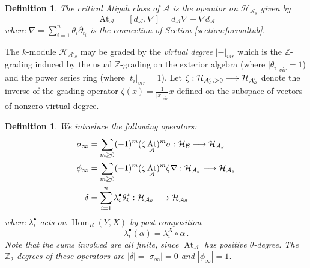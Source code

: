 \documentclass[english,letter paper,12pt,leqno]{article}
\theoremstyle{example}
\newtheorem{definition}[theorem]{Definition}
\numberwithin{equation}{section}
\def\AA{\mathcal{A}}
\def\BB{\mathcal{B}}
\def\HH{\HH}
\def\HH{\mathcal{H}}
\def\Hom{\operatorname{Hom}}
\def\nZ{\mathds{Z}}
\DeclareMathOperator{\vAt}{At}
\begin{document}
\begin{definition}\label{defn:atiyah_class} The \emph{critical Atiyah class} of $\AA$ is the operator on $\HH_{\AA_\theta}$ given by
\[
\vAt_{\AA} = [ d_{\AA}, \nabla ] = d_{\AA} \nabla + \nabla d_{\AA}
\]
where $\nabla = \sum_{i=1}^n \theta_i \partial_{t_i}$ is the connection of Section \ref{section:formaltub}.
\end{definition}

The $k$-module $\HH_{\AA'_\theta}$ may be graded by the \emph{virtual degree} $|-|_{vir}$ which is the $\nZ$-grading induced by the usual $\nZ$-grading on the exterior algebra (where $|\theta_i|_{vir} = 1$) and the power series ring (where $|t_i|_{vir} = 1$). Let $\zeta: \HH_{\AA'_\theta,>0} \lto \HH_{\AA'_\theta}$ denote the inverse of the grading operator $\zeta(x) = \frac{1}{|x|_{vir}} x$ defined on the subspace of vectors of nonzero virtual degree. 

\begin{definition}\label{defn:important_operators} We introduce the following operators:
\begin{align*}
\sigma_\infty &= \sum_{m \ge 0} (-1)^m (\zeta \vAt_{\AA})^m \sigma: \HH_{\BB} \lto \HH_{\AA_\theta}\\
\phi_\infty &= \sum_{m \ge 0} (-1)^m (\zeta \vAt_{\AA})^m \zeta \nabla: \HH_{\AA_\theta} \lto \HH_{\AA_\theta}\\
\delta &= \sum_{i=1}^n \lambda^\bullet_i \theta_i^*: \HH_{\AA_\theta} \lto \HH_{\AA_\theta}
\end{align*}
where $\lambda_i^\bullet$ acts on $\Hom_R(Y,X)$ by post-composition
\[
\lambda_i^\bullet(\alpha) = \lambda_i^X \circ \alpha\,.
\]
Note that the sums involved are all finite, since $\vAt_{\AA}$ has positive $\theta$-degree. The $\nZ_2$-degrees of these operators are $|\delta| = |\sigma_\infty| = 0$ and $|\phi_\infty| = 1$.
\end{definition}
\end{document}

